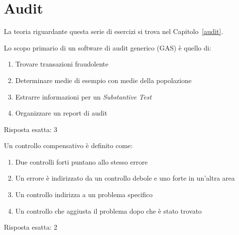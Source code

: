 \chapter{Audit}
\label{EsAudit}

La teoria riguardante questa serie di esercizi si trova nel
Capitolo~\ref{audit}.

\begin{Exercise} [
  title={Quiz},
  label={audit1}
  ]

  \Question Lo scopo primario di un software di audit generico (GAS) è quello 
di:
\begin{enumerate}
 \item Trovare transazioni fraudolente
 \item Determinare medie di esempio con medie della popolazione
 \item Estrarre informazioni per un \textit{Substantive Test}
 \item Organizzare un report di audit
\end{enumerate}

\end{Exercise}


\begin{Answer} [
  ref={audit1},
  number={1}
  ]

  \Question Risposta esatta: 3

\end{Answer}


\begin{Exercise} [
  title={Quiz},
  label={audit2}
  ]

  \Question Un controllo compensativo è definito come:
  \begin{enumerate}
   \item Due controlli forti puntano allo stesso errore
   \item Un errore è indirizzato da un controllo debole e uno forte in un'altra 
area
   \item Un controllo indirizza a un problema specifico
   \item Un controllo che aggiusta il problema dopo che è stato trovato
  \end{enumerate}

\end{Exercise}


\begin{Answer} [
  ref={audit2},
  number={2}
  ]

  \Question Risposta esatta: 2

\end{Answer}


